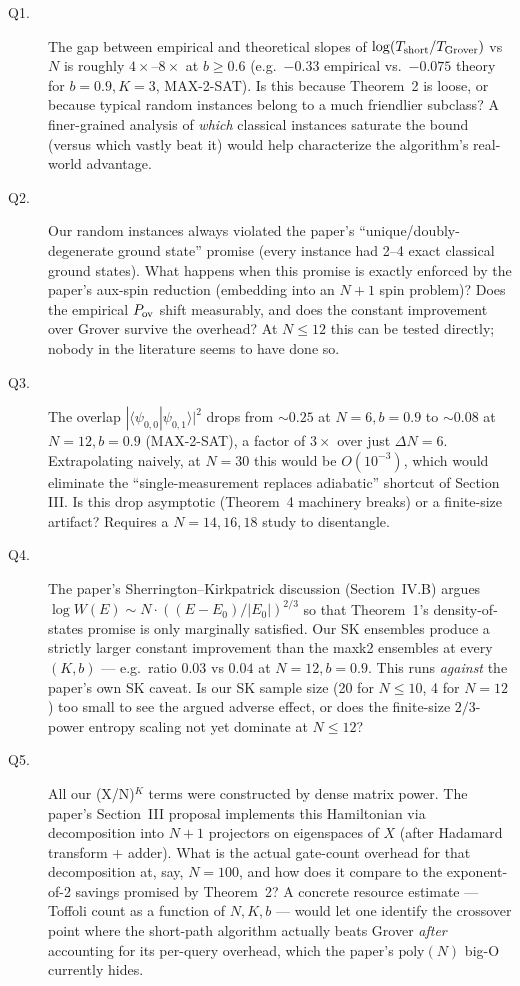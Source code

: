 \documentclass[11pt]{article}
\begin{document}
\begin{description}
\item[Q1.] The gap between empirical and theoretical slopes of $\log(T_{\rm short}/T_{\rm Grover})$ vs $N$ is roughly $4\times$--$8\times$ at $b\ge 0.6$ (e.g.\ $-0.33$ empirical vs.\ $-0.075$ theory for $b=0.9, K=3$, MAX-2-SAT). Is this because Theorem~2 is loose, or because typical random instances belong to a much friendlier subclass? A finer-grained analysis of \emph{which} classical instances saturate the bound (versus which vastly beat it) would help characterize the algorithm's real-world advantage.

\item[Q2.] Our random instances always violated the paper's ``unique/doubly-degenerate ground state'' promise (every instance had 2--4 exact classical ground states). What happens when this promise is exactly enforced by the paper's aux-spin reduction (embedding into an $N+1$ spin problem)? Does the empirical $P_{\rm ov}$ shift measurably, and does the constant improvement over Grover survive the overhead? At $N \le 12$ this can be tested directly; nobody in the literature seems to have done so.

\item[Q3.] The overlap $|\langle\psi_{0,0}|\psi_{0,1}\rangle|^2$ drops from ${\sim}0.25$ at $N=6, b=0.9$ to ${\sim}0.08$ at $N=12, b=0.9$ (MAX-2-SAT), a factor of $3\times$ over just $\Delta N = 6$. Extrapolating naively, at $N=30$ this would be $O(10^{-3})$, which would eliminate the ``single-measurement replaces adiabatic'' shortcut of Section III. Is this drop asymptotic (Theorem~4 machinery breaks) or a finite-size artifact? Requires a $N=14, 16, 18$ study to disentangle.

\item[Q4.] The paper's Sherrington--Kirkpatrick discussion (Section~IV.B) argues $\log W(E) \sim N\cdot ((E-E_0)/|E_0|)^{2/3}$ so that Theorem~1's density-of-states promise is only marginally satisfied. Our SK ensembles produce a strictly larger constant improvement than the maxk2 ensembles at every $(K, b)$ --- e.g.\ ratio $0.03$ vs $0.04$ at $N=12, b=0.9$. This runs \emph{against} the paper's own SK caveat. Is our SK sample size (20 for $N\le 10$, 4 for $N=12$) too small to see the argued adverse effect, or does the finite-size $2/3$-power entropy scaling not yet dominate at $N \le 12$?

\item[Q5.] All our (X/N)$^K$ terms were constructed by dense matrix power. The paper's Section~III proposal implements this Hamiltonian via decomposition into $N+1$ projectors on eigenspaces of $X$ (after Hadamard transform + adder). What is the actual gate-count overhead for that decomposition at, say, $N=100$, and how does it compare to the exponent-of-2 savings promised by Theorem~2? A concrete resource estimate --- Toffoli count as a function of $N, K, b$ --- would let one identify the crossover point where the short-path algorithm actually beats Grover \emph{after} accounting for its per-query overhead, which the paper's $\mathrm{poly}(N)$ big-O currently hides.
\end{description}
\end{document}
